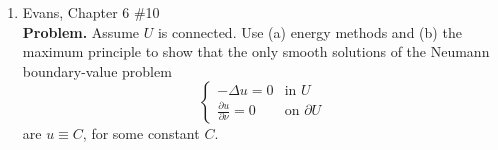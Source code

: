\documentclass[a4paper]{article}
\newenvironment{problem}{\textbf{Problem.}}{}
\begin{document}
\begin{enumerate}
\begin{proof}
      By the maximum principle, we know
      \[ \| u \|_{L^\infty(U)} \leq \| u \|_{L^\infty(\partial U)} \]
      and
      \[ \left\| |Du|^2 + \lambda u^2 \right\|_{L^\infty(U)} = \| v \|_{L^\infty(U)} \leq \| v \|_{L^\infty(\partial U)} = \left\| |Du|^2 + \lambda u^2
      \right\|_{L^\infty(\partial U)} .\]

      By the triangle inequality,
      \[ \left\| |Du|^2 \right\|_{L^\infty(U)} \leq \left\| |Du|^2 + \lambda u^2 \right\|_{L^\infty(U)} + \lambda \| u^2 \|_{L^\infty(U)} .\]
      Therefore,
      \begin{align*}
        \left\| |Du|^2 \right\|_{L^\infty(U)} - \lambda \|u^2\|_{L^\infty(U)}
        &\leq \left\| |Du|^2 + \lambda u^2 \right\|_{L^\infty(U)} \\
        &\leq \left\| |Du|^2 + \lambda u^2 \right\|_{L^\infty(\partial U)} \\
        &\leq \left\| |Du|^2 \right\|_{L^\infty(\partial U)} + \lambda \|u^2\|_{L^\infty(\partial U)}
      \end{align*}

      Adding $\lambda \|u^2\|_{L^\infty(U)}$ to both sides and using the maximum principle gives
      \begin{align*}
        \left\| |Du|^2 \right\|_{L^\infty(U)} &\leq \left\| |Du|^2 \right\|_{L^\infty(\partial U)} + 2\lambda \|u^2\|_{L^\infty(\partial U)} \\
        &\leq \left( \left\| Du \right\|_{L^\infty(\partial U)} + \sqrt{2 \lambda} \|u\|_{L^\infty(\partial U)} \right)^2
      \end{align*}

      Taking square roots gives
      \[ \| Du \|_{L^\infty(U)} \leq C \left( \| Du \|_{L^\infty(\partial U)} + \|u\|_{L^\infty(\partial U)} \right) \]
      with $C = \max \{1, \sqrt{2 \lambda} \}$.

    \end{proof}

  \item Evans, Chapter 6 \#10 \\
    \begin{problem}
      Assume $U$ is connected. Use (a) energy methods and (b) the maximum principle to show that the only smooth solutions of the Neumann
      boundary-value problem
      \[ \begin{cases}
          - \Delta u = 0 &\text{in } U \\
          \frac{\partial u}{\partial \nu} = 0 &\text{on } \partial U
      \end{cases} \]
      are $u \equiv C$, for some constant $C$.
    \end{problem}


\end{enumerate}
\end{document}

